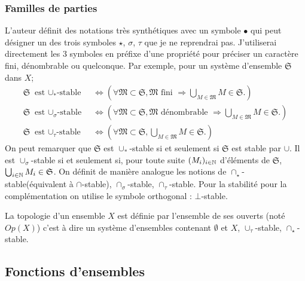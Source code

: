 \subsubsection{Familles de parties}
L'auteur définit des notations très synthétiques avec un symbole $\bullet$ qui peut désigner un des trois symboles $\star$, $\sigma$, $\tau$ que je ne reprendrai pas. J'utiliserai directement les 3 symboles en préfixe d'une propriété pour préciser un caractère fini, dénombrable ou quelconque. Par exemple, pour un système d'ensemble $\mathfrak{S}$ dans $X$;
\begin{align*}
\mathfrak{S} \text{ est $\cup_*$-stable } &\Leftrightarrow \left( \forall \mathfrak{M} \subset \mathfrak{S}, \mathfrak{M} \text{ fini } \Rightarrow \bigcup_{M \in \mathfrak{M}}M \in \mathfrak{S}.\right) \\
\mathfrak{S} \text{ est $\cup_\sigma$-stable } &\Leftrightarrow \left( \forall \mathfrak{M} \subset \mathfrak{S}, \mathfrak{M} \text{ dénombrable } \Rightarrow \bigcup_{M \in \mathfrak{M}}M \in \mathfrak{S}.\right) \\
\mathfrak{S} \text{ est $\cup_\tau$-stable } &\Leftrightarrow \left( \forall \mathfrak{M} \subset \mathfrak{S}, \bigcup_{M \in \mathfrak{M}}M \in \mathfrak{S}.\right)
\end{align*}
On peut remarquer que $\mathfrak{S}$ est $\cup_*$-stable si et seulement si $\mathfrak{S}$ est stable par $\cup$. Il est $\cup_\sigma$-stable si et seulement si, pour toute suite $(M_i)_{i\in \mathbb{N}}$ d'éléments de $\mathfrak{S}$, $\bigcup_{i\in \mathbb{N}}M_i \in \mathfrak{S}$.\newline
On définit de manière analogue les notions de $\cap_\star$-stable(équivalent à $\cap$-stable), $\cap_\sigma$-stable, $\cap_\tau$-stable. \newline
Pour la stabilité pour la complémentation on utilise le symbole orthogonal : $\bot$-stable.
\begin{exple}
 La topologie d'un ensemble $X$ est définie par l'ensemble de ses ouverts (noté $Op(X)$) c'est à dire un système d'ensembles contenant $\emptyset$ et $X$, $\cup_\tau$-stable, $\cap_\star$-stable.
\end{exple}

\subsection{Fonctions d'ensembles}\label{FoncEns}
